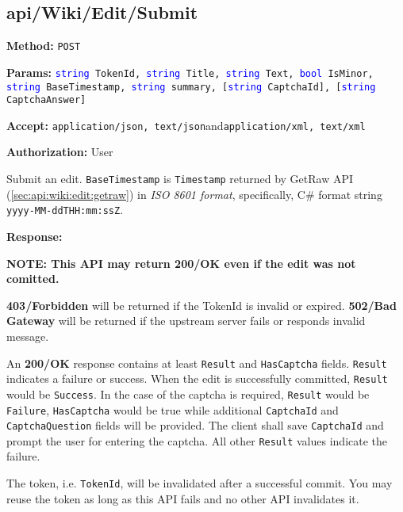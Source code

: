 \documentclass[a4paper,11pt]{report}
\newcommand{\method}[1]{\textsf{\textbf{Method:}} #1}
\newcommand{\params}[1]{\textsf{\textbf{Params:}} \texttt{#1}}
\newcommand{\accept}[1]{\textsf{\textbf{Accept:}} #1}
\newcommand{\response}[1]{\textsf{\textbf{Response:}} #1}
\newcommand{\auth}[1]{\textsf{\textbf{Authorization:}} #1}
\newcommand{\webapi}[6]{
    \method{#1}

    \params{#2}

    \accept{#3}

    \auth{#4}

    #5

    \response{#6}
    }
\newcommand{\sand}{\textsf{and}\xspace}
\newcommand{\httppost}{\texttt{POST}}
\newcommand{\json}{\texttt{application/json, text/json}\xspace}
\newcommand{\xml}{\texttt{application/xml, text/xml}\xspace}
\newcommand{\ok}{\textbf{200/OK}\xspace}
\newcommand{\forbidden}{\textbf{403/Forbidden}\xspace}
\newcommand{\badgateway}{\textbf{502/Bad Gateway}\xspace}
\newcommand{\authuser}{User}
\newcommand{\typestring}{\textcolor{blue}{string }}
\newcommand{\typebool}{\textcolor{blue}{bool }}
\begin{document}
\subsection{api/Wiki/Edit/Submit}
\label{sec:api:wiki:edit:submit}
\webapi
{\httppost}
{\typestring TokenId, \typestring Title, \typestring Text, \typebool IsMinor, \typestring BaseTimestamp, \typestring summary, [\typestring CaptchaId], [\typestring CaptchaAnswer]}
{\json \sand \xml}
{\authuser}
{Submit an edit. \texttt{BaseTimestamp} is \texttt{Timestamp} returned by GetRaw API (\ref{sec:api:wiki:edit:getraw}) in \emph{ISO 8601 format}, specifically, C\# format string \texttt{yyyy-MM-ddTHH:mm:ssZ}.}
{

\textbf{NOTE: This API may return \ok even if the edit was not comitted.}

\forbidden will be returned if the TokenId is invalid or expired. \badgateway will be returned if the upstream server fails or responds invalid message.

An \ok response contains at least \texttt{Result} and \texttt{HasCaptcha} fields. \texttt{Result} indicates a failure or success. When the edit is successfully committed, \texttt{Result} would be \texttt{Success}. In the case of the captcha is required, \texttt{Result} would be \texttt{Failure}, \texttt{HasCaptcha} would be true while additional \texttt{CaptchaId} and \texttt{CaptchaQuestion} fields will be provided. The client shall save \texttt{CaptchaId} and prompt the user for entering the captcha. All other \texttt{Result} values indicate the failure.

The token, i.e. \texttt{TokenId}, will be invalidated after a successful commit. You may reuse the token as long as this API fails and no other API invalidates it.
}
\end{document}

